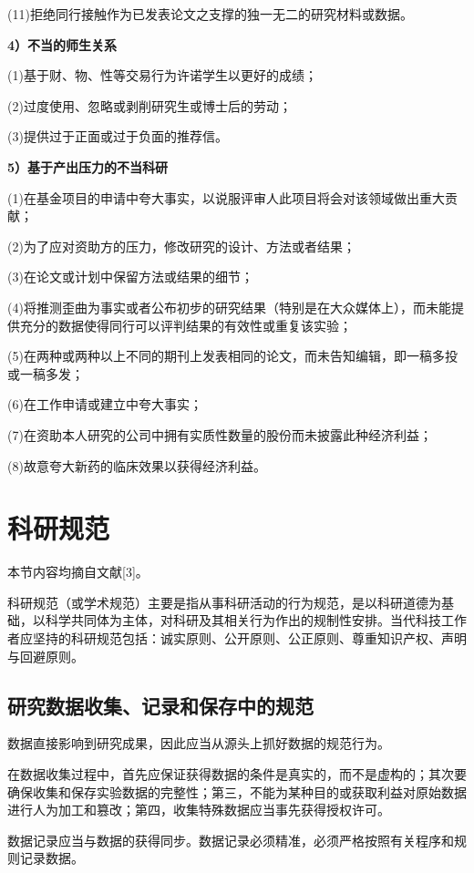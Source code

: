 (11)拒绝同行接触作为已发表论文之支撑的独一无二的研究材料或数据。

\textbf{4）不当的师生关系}

(1)基于财、物、性等交易行为许诺学生以更好的成绩；

(2)过度使用、忽略或剥削研究生或博士后的劳动；

(3)提供过于正面或过于负面的推荐信。

\textbf{5）基于产出压力的不当科研}

(1)在基金项目的申请中夸大事实，以说服评审人此项目将会对该领域做出重大贡献；

(2)为了应对资助方的压力，修改研究的设计、方法或者结果；

(3)在论文或计划中保留方法或结果的细节；

(4)将推测歪曲为事实或者公布初步的研究结果（特别是在大众媒体上），而未能提供充分的数据使得同行可以评判结果的有效性或重复该实验；

(5)在两种或两种以上不同的期刊上发表相同的论文，而未告知编辑，即一稿多投或一稿多发；

(6)在工作申请或建立中夸大事实；

(7)在资助本人研究的公司中拥有实质性数量的股份而未披露此种经济利益；

(8)故意夸大新药的临床效果以获得经济利益。

\section{科研规范}

本节内容均摘自文献[3]。

科研规范（或学术规范）主要是指从事科研活动的行为规范，是以科研道德为基础，以科学共同体为主体，对科研及其相关行为作出的规制性安排。当代科技工作者应坚持的科研规范包括：诚实原则、公开原则、公正原则、尊重知识产权、声明与回避原则。

\subsection{研究数据收集、记录和保存中的规范}

数据直接影响到研究成果，因此应当从源头上抓好数据的规范行为。

在数据收集过程中，首先应保证获得数据的条件是真实的，而不是虚构的；其次要确保收集和保存实验数据的完整性；第三，不能为某种目的或获取利益对原始数据进行人为加工和篡改；第四，收集特殊数据应当事先获得授权许可。

数据记录应当与数据的获得同步。数据记录必须精准，必须严格按照有关程序和规则记录数据。

